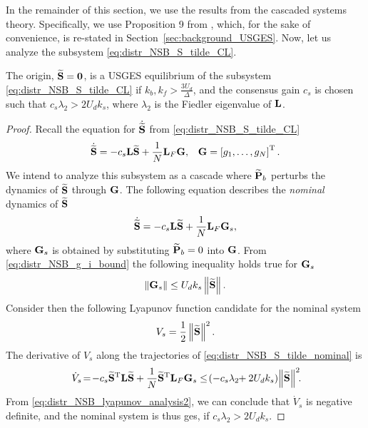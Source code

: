 In the remainder of this section, we use the results from the cascaded systems theory.
Specifically, we use Proposition 9 from \cite{pettersen_lyapunov_2017}, which, for the sake of convenience, is re-stated in Section~\ref{sec:background_USGES}.
Now, let us analyze the subsystem \eqref{eq:distr_NSB_S_tilde_CL}.
\begin{lemma}
    \label{lemma2}
    The origin, $\widetilde{\mathbf{S}} = \mathbf{0}$, is a USGES equilibrium of the subsystem \eqref{eq:distr_NSB_S_tilde_CL} if $k_b, k_f > \frac{3U_d}{\Delta}$, and the consensus gain $c_s$ is chosen such that $c_s \lambda_2 > 2 U_d k_s$, where $\lambda_2$ is the Fiedler eigenvalue of $\mathbf{L}$.
\end{lemma}
\begin{proof}
    Recall the equation for $\dot{\widetilde{\mathbf{S}}}$ from \eqref{eq:distr_NSB_S_tilde_CL}
    \begin{align}
        \dot{\widetilde{\mathbf{S}}} &= -c_s \mathbf{L} \widetilde{\mathbf{S}} + \frac{1}{N} \mathbf{L}_{F} \mathbf{G}, &
        \mathbf{G} = \left[g_1, \ldots, g_N\right]^{\mathrm{T}}.
    \end{align}
    We intend to analyze this subsystem as a cascade where ${\widetilde{\mathbf{P}}}_{b}$ perturbs the dynamics of $\widetilde{\mathbf{S}}$ through $\mathbf{G}$.
    The following equation describes the \emph{nominal} dynamics of $\widetilde{\mathbf{S}}$
    \begin{equation}
        \dot{\widetilde{\mathbf{S}}} = -c_s \mathbf{L} \widetilde{\mathbf{S}} + \frac{1}{N} \mathbf{L}_{F} \mathbf{G}_s,
        \label{eq:distr_NSB_S_tilde_nominal}
    \end{equation}
    where $\mathbf{G}_s$ is obtained by substituting ${\widetilde{\mathbf{P}}}_{b} = 0$ into $\mathbf{G}$.
    From \eqref{eq:distr_NSB_g_i_bound} the following inequality holds true for $\mathbf{G}_s$
    \begin{equation}
        \left\|\mathbf{G}_s\right\| \leq U_d k_s \left\|\widetilde{\mathbf{S}}\right\|.
    \end{equation}
    Consider then the following Lyapunov function candidate for the nominal system
    \begin{equation}
        V_s = \frac{1}{2} \left\|\widetilde{\mathbf{S}}\right\|^2.
    \end{equation}
    The derivative of $V_s$ along the trajectories of \eqref{eq:distr_NSB_S_tilde_nominal} is
    \begin{equation}
        \dot{V}_{s\!} = \! - c_s \widetilde{\mat{S}}\T \mat{L} \widetilde{\mat{S}} + \frac{1}{N} \widetilde{\mat{S}}\T \mat{L}_{F} \mat{G}_s
        \leq \! \left( -c_s \lambda_{2\!\!} + 2 U_d k_s \right) \! \norm{\widetilde{\mat{S}}}^2\!\!\mathrlap{.}
        \label{eq:distr_NSB_lyapunov_analysis2}
    \end{equation}
    From \eqref{eq:distr_NSB_lyapunov_analysis2}, we can conclude that $\dot{V}_s$ is negative definite, and the nominal system is thus \gls{ges}, if $c_s \lambda_2 > 2 U_d k_s$.
    

\end{proof}
